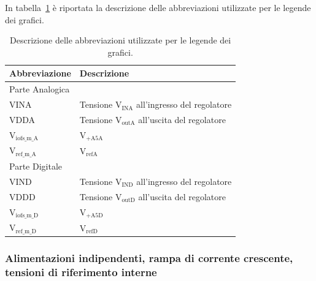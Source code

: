 In tabella~\ref{tab:legenda} è riportata la descrizione delle abbreviazioni utilizzate per le legende dei grafici.
\begin{table}
\begin{center}
\begin{tabular}{l|l}
 Abbreviazione & Descrizione\\ \hline
\multicolumn{2}{l}{Parte Analogica} \\
\hline
VINA & Tensione $\mathrm{V_{INA}}$ all'ingresso del regolatore  \\ \hline
VDDA & Tensione $\mathrm{V_{outA}}$ all'uscita del regolatore \\ \hline
$\mathrm{V_{iofs \_ m \_ A}}$ & $\mathrm{V_{+A5A}}$ \\ \hline   
$\mathrm{V_{ref \_ m \_ A}}$  & $\mathrm{V_{refA}}$ \\ \hline \hline  
\multicolumn{2}{l}{Parte Digitale} \\ \hline
VIND & Tensione $\mathrm{V_{IND}}$ all'ingresso del regolatore  \\ \hline
VDDD & Tensione $\mathrm{V_{outD}}$ all'uscita del regolatore \\ \hline
$\mathrm{V_{iofs \_ m \_ D}}$ & $\mathrm{V_{+A5D}}$ \\ \hline   
$\mathrm{V_{ref \_ m \_ D}}$  & $\mathrm{V_{refD}}$ \\ 
\end{tabular}
\end{center}
\caption{Descrizione delle abbreviazioni utilizzate per le legende dei grafici.}
\label{tab:legenda}
\end{table}

\subsubsection{Alimentazioni indipendenti, rampa di corrente crescente, tensioni di riferimento interne}
\label{sec:iui}

